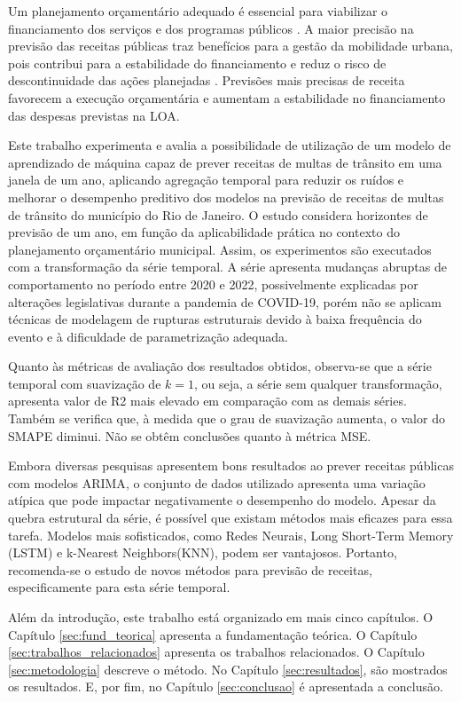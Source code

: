 \documentclass[12pt]{tcc}
\begin{document}
Um planejamento orçamentário adequado é essencial para viabilizar o financiamento dos serviços e dos programas públicos \citep{nascimento_fatores_2022}. A maior precisão na previsão das receitas públicas traz benefícios para a gestão da mobilidade urbana, pois contribui para a estabilidade do financiamento e reduz o risco de descontinuidade das ações planejadas \citep{da2017orccamento}. Previsões mais precisas de receita favorecem a execução orçamentária e aumentam a estabilidade no financiamento das despesas previstas na \gls{LOA}.

Este trabalho experimenta e avalia a possibilidade de utilização de um modelo de aprendizado de máquina capaz de prever receitas de multas de trânsito em uma janela de um ano, aplicando agregação temporal para reduzir os ruídos e melhorar o desempenho preditivo dos modelos na previsão de receitas de multas de trânsito do município do Rio de Janeiro. O estudo considera horizontes de previsão de um ano, em função da aplicabilidade prática no contexto do planejamento orçamentário municipal. Assim, os experimentos são executados com a transformação da série temporal. A série apresenta mudanças abruptas de comportamento no período entre 2020 e 2022, possivelmente explicadas por alterações legislativas durante a pandemia de COVID-19, porém não se aplicam técnicas de modelagem de rupturas estruturais devido à baixa frequência do evento e à dificuldade de parametrização adequada.

Quanto às métricas de avaliação dos resultados obtidos, observa-se que a série temporal com suavização de $k=1$, ou seja, a série sem qualquer transformação, apresenta valor de \gls{R2} mais elevado em comparação com as demais séries. Também se verifica que, à medida que o grau de suavização aumenta, o valor do \gls{SMAPE} diminui. Não se obtêm conclusões quanto à métrica \gls{MSE}.

Embora diversas pesquisas apresentem bons resultados ao prever receitas públicas com modelos \gls{ARIMA}, o conjunto de dados utilizado apresenta uma variação atípica que pode impactar negativamente o desempenho do modelo. Apesar da quebra estrutural da série, é possível que existam métodos mais eficazes para essa tarefa. Modelos mais sofisticados, como Redes Neurais, Long Short-Term Memory (LSTM) e k-Nearest Neighbors(KNN), podem ser vantajosos. Portanto, recomenda-se o estudo de novos métodos para previsão de receitas, especificamente para esta série temporal.

Além da introdução, este trabalho está organizado em mais cinco capítulos. O Capítulo \ref{sec:fund_teorica} apresenta a fundamentação teórica. O Capítulo \ref{sec:trabalhos_relacionados} apresenta os trabalhos relacionados. O Capítulo \ref{sec:metodologia} descreve o método. No Capítulo \ref{sec:resultados}, são mostrados os resultados. E, por fim, no Capítulo \ref{sec:conclusao} é apresentada a conclusão.
\end{document}
